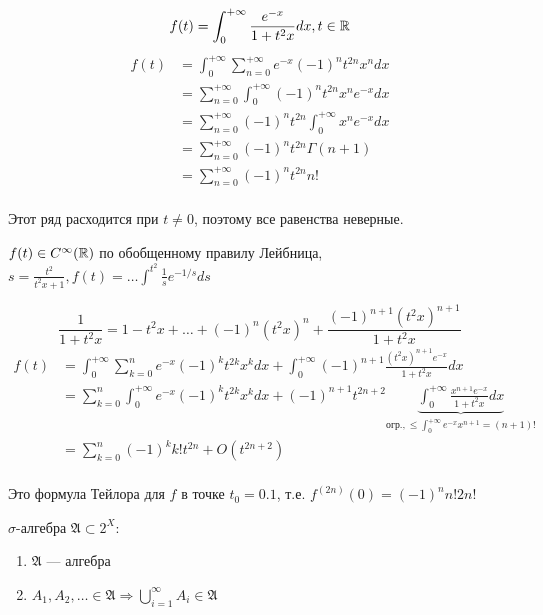 \begin{example}
    \[f(t) = \int_0^{ +\infty} \frac{e^{ - x}}{1 + t^2x} dx, t\in\mathbb{R}\]
    \begin{align*}
        f(t) & = \int_0^{ +\infty} \sum_{n = 0}^{ +\infty} e^{ - x}( - 1)^n t^{2n} x^n dx  \\
             & = \sum_{n = 0}^{ +\infty} \int_0^{ +\infty} ( - 1)^n t^{2n} x^n e^{ - x} dx \\
             & = \sum_{n = 0}^{ +\infty} ( - 1)^n t^{2n} \int_0^{ +\infty} x^n e^{ - x} dx \\
             & = \sum_{n = 0}^{ +\infty} ( - 1)^n t^{2n} \Gamma(n + 1)                     \\
             & = \sum_{n = 0}^{ +\infty} ( - 1)^n t^{2n} n!                                \\
    \end{align*}

    Этот ряд расходится при \(t\neq 0\), поэтому все равенства неверные.

    \(f(t)\in C^{\infty}(\mathbb{R})\) по обобщенному правилу Лейбница, \(s = \frac{t^2}{t^2x + 1}, f(t) = \dots \int^{t^2} \frac{1}{s} e^{ - 1 / s} ds\)

    \[\frac{1}{1 + t^2x} = 1 - t^2x + \dots + ( - 1)^n (t^2x)^n + \frac{( - 1)^{n + 1} (t^2x)^{n + 1}}{1 + t^2x}\]
    \begin{align*}
        f(t)
         & = \int_0^{ +\infty} \sum_{k = 0}^n e^{ - x}( - 1)^k t^{2k} x^k dx + \int_0^{ +\infty} ( - 1)^{n + 1} \frac{(t^2x)^{n + 1} e^{ - x}}{1 + t^2 x} dx                                                                                \\
         & = \sum_{k = 0}^n \int_0^{ +\infty} e^{ - x}( - 1)^k t^{2k} x^k dx + ( - 1)^{n + 1} t^{2n + 2} \underbrace{\int_0^{ +\infty} \frac{x^{n + 1} e^{ - x}}{1 + t^2 x} dx}_{\text{огр.}, \le \int_0^{+\infty} e^{-x} x^{n+1} = (n+1)!} \\
         & = \sum_{k = 0}^n ( - 1)^k k! t^{2n} + O(t^{2n + 2})                                                                                                                                                                              \\
    \end{align*}

    Это формула Тейлора для \(f\) в точке \(t_0 = 0.1\), т.е. \(f^{(2n)}(0) = ( - 1)^n n!2n!\)
\end{example}

\begin{definition}
    \(\sigma\)-алгебра \(\mathfrak A \subset 2^X\):
    \begin{enumerate}
        \item \(\mathfrak A\) --- алгебра
        \item \(A_1, A_2, \dots \in \mathfrak A \Rightarrow \bigcup\limits_{i = 1}^{\infty} A_i \in \mathfrak A\)
    \end{enumerate}
\end{definition}

